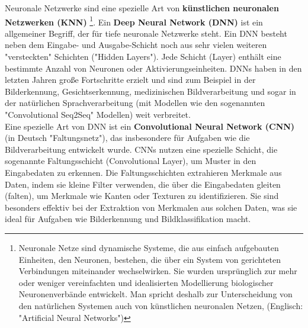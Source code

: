 \documentclass[12pt]{article}
\begin{document}
Neuronale Netzwerke sind eine spezielle Art von \textbf{künstlichen neuronalen Netzwerken (KNN)}  \footnote{Neuronale Netze sind dynamische Systeme, die aus einfach aufgebauten Einheiten, den Neuronen, bestehen, die über ein System von gerichteten Verbindungen miteinander wechselwirken. Sie wurden ursprünglich zur mehr oder weniger vereinfachten und idealisierten Modellierung biologischer Neuronenverbände entwickelt. Man spricht deshalb zur Unterscheidung von den natürlichen Systemen auch von künstlichen neuronalen Netzen, (Englisch: "Artificial Neural Networks")}.
Ein \textbf{Deep Neural Network (DNN)} ist ein allgemeiner Begriff, der für tiefe neuronale Netzwerke steht. Ein DNN besteht neben dem Eingabe- und Ausgabe-Schicht noch aus sehr vielen weiteren "versteckten" Schichten ("Hidden Layers"). Jede Schicht (Layer) enthält eine bestimmte Anzahl von Neuronen oder Aktivierungseinheiten. DNNs haben in den letzten Jahren große Fortschritte erzielt und sind zum Beispiel in der Bilderkennung, Gesichtserkennung, medizinischen Bildverarbeitung und sogar in der natürlichen Sprachverarbeitung (mit Modellen wie den sogenannten "Convolutional Seq2Seq" Modellen) weit verbreitet.\\
Eine spezielle Art von DNN ist ein \textbf{Convolutional Neural Network (CNN)}  (in Deutsch "Faltungsnetz"), das insbesondere für Aufgaben wie die Bildverarbeitung entwickelt wurde. CNNs nutzen eine spezielle Schicht, die sogenannte Faltungsschicht (Convolutional Layer), um Muster in den Eingabedaten zu erkennen. Die Faltungsschichten extrahieren Merkmale aus Daten, indem sie kleine Filter verwenden, die über die Eingabedaten gleiten (falten), um Merkmale wie Kanten oder Texturen zu identifizieren. Sie sind besonders effektiv bei der Extraktion von Merkmalen aus solchen Daten, was sie ideal für Aufgaben wie Bilderkennung und Bildklassifikation macht.%
\end{document}
